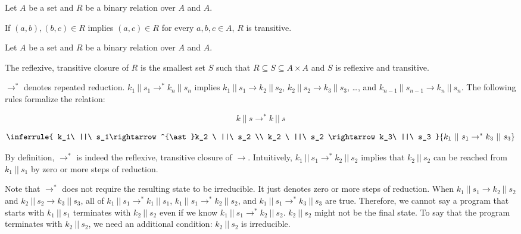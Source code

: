 \begin{kaobox}[frametitle=Transitive relations]
Let $A$ be a set and $R$ be a binary relation over $A$ and $A$.

If $(a,b),(b,c)\in R$ implies $(a,c)\in R$ for every $a,b,c\in A$, $R$ is
transitive.
\end{kaobox}

\begin{kaobox}[frametitle={Reflexive, transitive closures}]
Let $A$ be a set and $R$ be a binary relation over $A$ and $A$.

The reflexive, transitive closure of $R$ is the smallest set $S$ such that $R\subseteq
  S\subseteq A\times A$ and $S$ is reflexive and transitive.
\end{kaobox}

$\rightarrow^\ast$ denotes repeated reduction. $k_1\ ||\ s_1\rightarrow^\ast k_n\
||\ s_n$ implies $k_1\ ||\ s_1\rightarrow k_2\ ||\ s_2$, $k_2\ ||\ s_2\rightarrow
k_3\ ||\ s_3$, …, and $k_{n-1}\ ||\ s_{n-1}\rightarrow k_n\ ||\ s_n$. The
following rules formalize the relation:

\[k\ ||\ s\rightarrow^{\ast}k\ ||\ s\]

\[
\inferrule
{ k_1\ ||\ s_1\rightarrow^{\ast}k_2 \ ||\ s_2 \\
  k_2 \ ||\ s_2 \rightarrow k_3\ ||\ s_3 }
{ k_1\ ||\ s_1\rightarrow^{\ast}k_3\ ||\ s_3 }
\]

By definition, $\rightarrow^\ast$ is indeed the reflexive, transitive
closure of $\rightarrow$. Intuitively,
$k_1\ ||\ s_1\rightarrow^{\ast}k_2\ ||\ s_2$ implies that $k_2\ ||\ s_2$
can be reached from $k_1\ ||\ s_1$ by zero or more steps of reduction.

Note that $\rightarrow^\ast$ does not require the resulting state to be
irreducible. It just denotes zero or more steps of reduction.
When $k_1\ ||\ s_1\rightarrow k_2\ ||\ s_2$ and $k_2\ ||\ s_2\rightarrow k_3\
||\ s_3$,
all of $k_1\ ||\ s_1\rightarrow^\ast k_1\
||\ s_1$, $k_1\ ||\ s_1\rightarrow^\ast k_2\ ||\ s_2$, and $k_1\ ||\
s_1\rightarrow^\ast k_3\ ||\ s_3$ are true.
Therefore, we cannot say a program that starts with $k_1\ ||\ s_1$ terminates with
$k_2\ ||\ s_2$ even if we know $k_1\ ||\ s_1\rightarrow^\ast k_2\ ||\ s_2$. $k_2\ ||\ s_2$
might not be the final state. To say that the program terminates with $k_2\ ||\
s_2$, we need an additional condition: $k_2\ ||\ s_2$ is irreducible.

